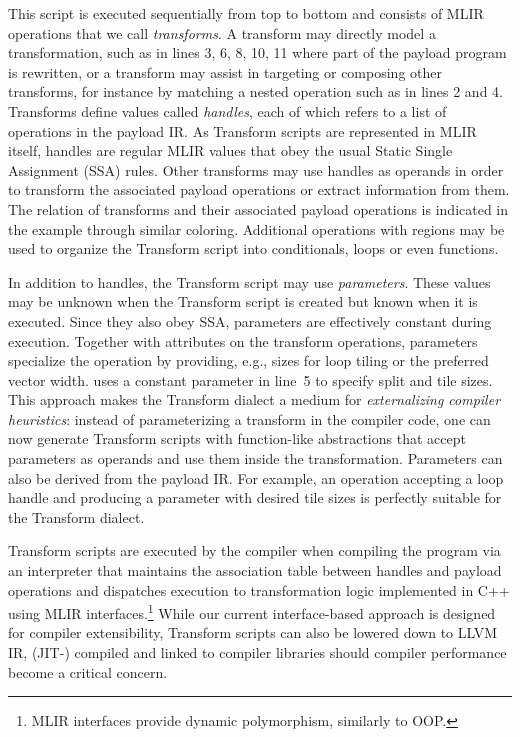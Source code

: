 \documentclass[screen,nonacm,authorversion]{acmart}
\begin{document}
This script is executed sequentially from top to bottom and consists of MLIR operations that we call \emph{transforms}. A transform may directly model a transformation, such as in lines 3, 6, 8, 10, 11 where part of the payload program is rewritten, or a transform may assist in targeting or composing other transforms, for instance by matching a nested operation such as in lines 2 and 4. Transforms define values called \emph{handles}, each of which refers to a list of operations in the payload IR.
As Transform scripts are represented in MLIR itself, handles are regular MLIR values that obey the usual Static Single Assignment (SSA) rules. Other transforms may use handles as operands in order to transform the associated payload operations or extract information from them. The relation of transforms and their associated payload operations is indicated in the example through similar coloring. Additional operations with regions may be used to organize the Transform script into conditionals, loops or even functions.

In addition to handles, the Transform script may use \emph{parameters}. These values may be unknown when the Transform script is created but known when it is executed. Since they also obey SSA, parameters are effectively constant during execution. Together with attributes on the transform operations, parameters specialize the operation by providing, e.g., sizes for loop tiling or the preferred vector width.  uses a constant parameter in line~5 to specify split and tile sizes. This approach makes the Transform dialect a medium for \emph{externalizing compiler heuristics}: instead of parameterizing a transform in the compiler code, one can now generate Transform scripts with function-like abstractions that accept parameters as operands and use them inside the transformation. Parameters can also be derived from the payload IR. For example, an operation accepting a loop handle and producing a parameter with desired tile sizes is perfectly suitable for the Transform dialect.

Transform scripts are executed by the compiler when compiling the program via an interpreter that maintains the association table between handles and payload operations and dispatches execution to transformation logic implemented in C++ using MLIR interfaces.\footnote{MLIR interfaces provide dynamic polymorphism, similarly to OOP.} While our current interface-based approach is designed for compiler extensibility, Transform scripts can also be lowered down to LLVM IR, (JIT\nobreakdash-) compiled and linked to compiler libraries should compiler performance become a critical concern.
\end{document}
